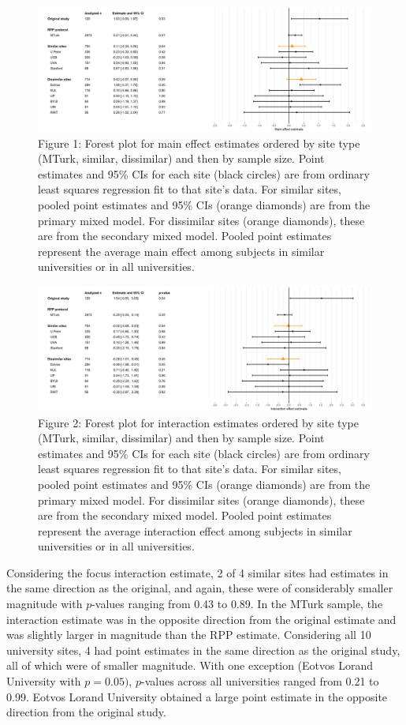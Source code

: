 \documentclass[english,floatsintext,man]{apa6}
\theoremstyle{definition}
\theoremstyle{definition}
\theoremstyle{definition}
\theoremstyle{remark}
\begin{document}
\begin{figure}
\centering
\includegraphics{main_forest.png}
\caption{Figure 1: Forest plot for main effect estimates ordered by site
type (MTurk, similar, dissimilar) and then by sample size. Point
estimates and 95\% CIs for each site (black circles) are from ordinary
least squares regression fit to that site's data. For similar sites,
pooled point estimates and 95\% CIs (orange diamonds) are from the
primary mixed model. For dissimilar sites (orange diamonds), these are
from the secondary mixed model. Pooled point estimates represent the
average main effect among subjects in similar universities or in all
universities.}
\end{figure}

\begin{figure}
\centering
\includegraphics{int_forest.png}
\caption{Figure 2: Forest plot for interaction estimates ordered by site
type (MTurk, similar, dissimilar) and then by sample size. Point
estimates and 95\% CIs for each site (black circles) are from ordinary
least squares regression fit to that site's data. For similar sites,
pooled point estimates and 95\% CIs (orange diamonds) are from the
primary mixed model. For dissimilar sites (orange diamonds), these are
from the secondary mixed model. Pooled point estimates represent the
average interaction effect among subjects in similar universities or in
all universities.}
\end{figure}

Considering the focus interaction estimate, 2 of 4 similar sites had
estimates in the same direction as the original, and again, these were
of considerably smaller magnitude with \(p\)-values ranging from 0.43 to
0.89. In the MTurk sample, the interaction estimate was in the opposite
direction from the original estimate and was slightly larger in
magnitude than the RPP estimate. Considering all 10 university sites, 4
had point estimates in the same direction as the original study, all of
which were of smaller magnitude. With one exception (Eotvos Lorand
University with \(p= 0.05)\), \(p\)-values across all universities
ranged from 0.21 to 0.99. Eotvos Lorand University obtained a large
point estimate in the opposite direction from the original study.
\end{document}

